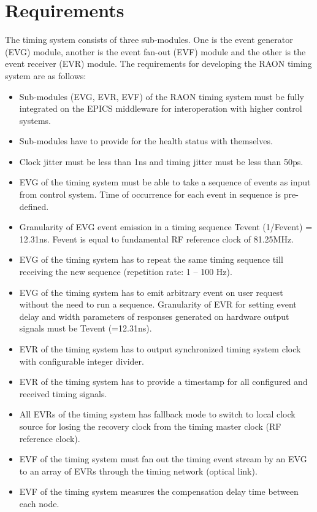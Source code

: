 \documentclass[11pt,a4paper]{article}
\begin{document}
\section{Requirements}

The timing system consists of three sub-modules. One is the event generator (EVG) module, another is the event fan-out (EVF) module and the other is the event receiver (EVR) module.\newline
The requirements for developing the RAON timing system are as follows:
\begin{itemize}
	\item Sub-modules (EVG, EVR, EVF) of the RAON timing system must be fully integrated on the EPICS middleware for interoperation with higher control systems.
	\item Sub-modules have to provide for the health status with themselves.
	\item Clock jitter must be less than 1ns and timing jitter must be less than 50ps.
	\item EVG of the timing system must be able to take a sequence of events as input from control system. Time of occurrence for each event in sequence is pre-defined.
	\item Granularity of EVG event emission in a timing sequence Tevent (1/Fevent) = 12.31ns. Fevent is equal to fundamental RF reference clock of 81.25MHz.
	\item EVG of the timing system has to repeat the same timing sequence till receiving the new sequence (repetition rate: 1 – 100 Hz).
	\item EVG of the timing system has to emit arbitrary event on user request without the need to run a sequence.
	Granularity of EVR for setting event delay and width parameters of responses generated on hardware output signals must be Tevent (=12.31ns).
	\item EVR of the timing system has to output synchronized timing system clock with configurable integer divider.
	\item EVR of the timing system has to provide a timestamp for all configured and received timing signals.
	\item All EVRs of the timing system has fallback mode to switch to local clock source for losing the recovery clock from the timing master clock (RF reference clock).
	\item EVF of the timing system must fan out the timing event stream by an EVG to an array of EVRs through the timing network (optical link).
	\item EVF of the timing system measures the compensation delay time between each node.
\end{itemize}
\end{document}
